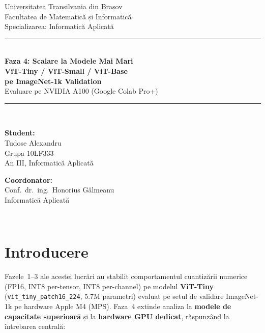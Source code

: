 \documentclass[12pt,a4paper]{article}
\begin{document}

\begin{titlepage}
  \centering
  {\large Universitatea Transilvania din Brașov\\}
  {\small Facultatea de Matematică și Informatică\\}
  {\small Specializarea: Informatică Aplicată\\[2cm]}

  \rule{\linewidth}{0.4pt}\\[0.5cm]
  {\LARGE\bfseries Faza 4: Scalare la Modele Mai Mari\\[0.3cm]}
  {\Large\bfseries ViT-Tiny / ViT-Small / ViT-Base\\[0.2cm]}
  {\Large\bfseries pe ImageNet-1k Validation\\[0.2cm]}
  {\large Evaluare pe NVIDIA A100 (Google Colab Pro+)}\\[0.3cm]
  \rule{\linewidth}{0.4pt}\\[2cm]

  \begin{minipage}{0.45\textwidth}
    \textbf{Student:}\\
    Tudose Alexandru\\
    Grupa 10LF333\\
    An III, Informatică Aplicată
  \end{minipage}
  \hfill
  \begin{minipage}{0.45\textwidth}
    \raggedleft
    \textbf{Coordonator:}\\
    Conf.\ dr.\ ing.\ Honorius Gâlmeanu\\
    Informatică Aplicată
  \end{minipage}\\[3cm]

\end{titlepage}

\tableofcontents
\newpage

\section{Introducere}

Fazele~1--3 ale acestei lucrări au stabilit comportamentul cuantizării numerice
(FP16, INT8 per-tensor, INT8 per-channel) pe modelul \textbf{ViT-Tiny}
(\texttt{vit\_tiny\_patch16\_224}, 5.7M parametri) evaluat pe setul de validare
ImageNet-1k pe hardware Apple M4 (MPS). Faza~4 extinde analiza la
\textbf{modele de capacitate superioară} și la \textbf{hardware GPU dedicat},
răspunzând la întrebarea centrală:
\end{document}
